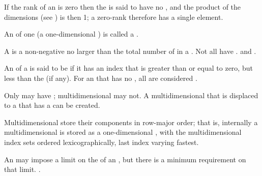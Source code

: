 If the rank of an  is zero then the  is said to have
no , and the product of the dimensions (see )
is then 1; a zero-rank  therefore has a single element.


An  of  one (\ie a one-dimensional )
is called a .


A  is a non-negative  no
larger than the total number of  in a .
Not all  have .
 and .

An  of a  is said to be  if it has
an index that is greater than or equal to zero, 
but less than the  (if any).
For an  that has no ,
all  are considered .

Only  may have ; 
multidimensional  may not.
A multidimensional  that is displaced to a  
that has a  can be created.

\endsubsubsubsubsection%

\endsubsubsubsection%



Multidimensional  store their components in row-major order;
that is, internally a multidimensional  is stored as a
one-dimensional , with the multidimensional index sets
ordered lexicographically, last index varying fastest.  
 
\endsubsubsubsubsection%


An  may impose a limit on the  of an ,
but there is a minimum requirement on that limit.  .

\endsubsubsubsubsection%

